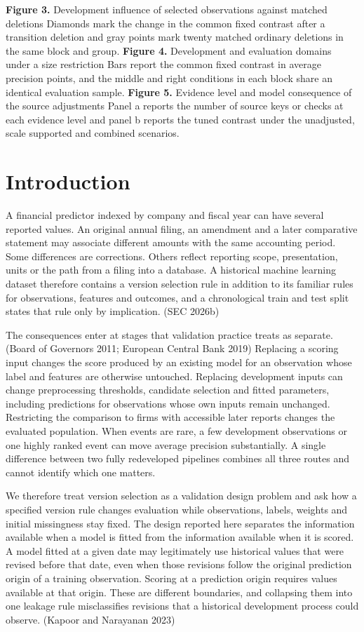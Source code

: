\documentclass[10pt,a4paper,twocolumn]{article}
\begin{document}
\noindent\textbf{Figure 3.} Development influence of selected observations against matched deletions Diamonds mark the change in the common fixed contrast after a transition deletion and gray points mark twenty matched ordinary deletions in the same block and group.
\noindent\textbf{Figure 4.} Development and evaluation domains under a size restriction Bars report the common fixed contrast in average precision points, and the middle and right conditions in each block share an identical evaluation sample.
\noindent\textbf{Figure 5.} Evidence level and model consequence of the source adjustments Panel a reports the number of source keys or checks at each evidence level and panel b reports the tuned contrast under the unadjusted, scale supported and combined scenarios.
\section{Introduction}
A financial predictor indexed by company and fiscal year can have several reported values. An original annual filing, an amendment and a later comparative statement may associate different amounts with the same accounting period. Some differences are corrections. Others reflect reporting scope, presentation, units or the path from a filing into a database. A historical machine learning dataset therefore contains a version selection rule in addition to its familiar rules for observations, features and outcomes, and a chronological train and test split states that rule only by implication. (SEC 2026b)

The consequences enter at stages that validation practice treats as separate. (Board of Governors 2011; European Central Bank 2019) Replacing a scoring input changes the score produced by an existing model for an observation whose label and features are otherwise untouched. Replacing development inputs can change preprocessing thresholds, candidate selection and fitted parameters, including predictions for observations whose own inputs remain unchanged. Restricting the comparison to firms with accessible later reports changes the evaluated population. When events are rare, a few development observations or one highly ranked event can move average precision substantially. A single difference between two fully redeveloped pipelines combines all three routes and cannot identify which one matters.

We therefore treat version selection as a validation design problem and ask how a specified version rule changes evaluation while observations, labels, weights and initial missingness stay fixed. The design reported here separates the information available when a model is fitted from the information available when it is scored. A model fitted at a given date may legitimately use historical values that were revised before that date, even when those revisions follow the original prediction origin of a training observation. Scoring at a prediction origin requires values available at that origin. These are different boundaries, and collapsing them into one leakage rule misclassifies revisions that a historical development process could observe. (Kapoor and Narayanan 2023)
\end{document}
